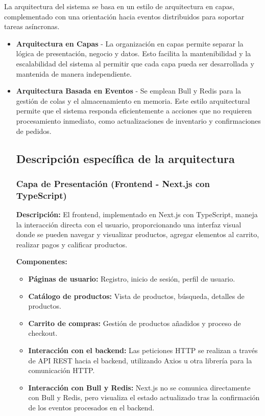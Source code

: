 \documentclass[12pt]{article}
\begin{document}
La arquitectura del sistema se basa en un estilo de arquitectura en capas, complementado con una orientación hacia eventos distribuidos para soportar tareas asíncronas.

\begin{itemize}
    \item \textbf{Arquitectura en Capas} - La organización en capas permite separar la lógica de presentación, negocio y datos. Esto facilita la mantenibilidad y la escalabilidad del sistema al permitir que cada capa pueda ser desarrollada y mantenida de manera independiente.
    \item \textbf{Arquitectura Basada en Eventos} - Se emplean Bull y Redis para la gestión de colas y el almacenamiento en memoria. Este estilo arquitectural permite que el sistema responda eficientemente a acciones que no requieren procesamiento inmediato, como actualizaciones de inventario y confirmaciones de pedidos.

    \subsection{Descripción específica de la arquitectura}

    \subsubsection{Capa de Presentación (Frontend - Next.js con TypeScript)}
    \textbf{Descripción:} El frontend, implementado en Next.js con TypeScript, maneja la interacción directa con el usuario, proporcionando una interfaz visual donde se pueden navegar y visualizar productos, agregar elementos al carrito, realizar pagos y calificar productos.

    \textbf{Componentes:}
    \begin{itemize}
        \item \textbf{Páginas de usuario:} Registro, inicio de sesión, perfil de usuario.
        \item \textbf{Catálogo de productos:} Vista de productos, búsqueda, detalles de productos.
        \item \textbf{Carrito de compras:} Gestión de productos añadidos y proceso de checkout.
        \item \textbf{Interacción con el backend:} Las peticiones HTTP se realizan a través de API REST hacia el backend, utilizando Axios u otra librería para la comunicación HTTP.
        \item \textbf{Interacción con Bull y Redis:} Next.js no se comunica directamente con Bull y Redis, pero visualiza el estado actualizado tras la confirmación de los eventos procesados en el backend.
    \end{itemize}


\end{itemize}
\end{document}
